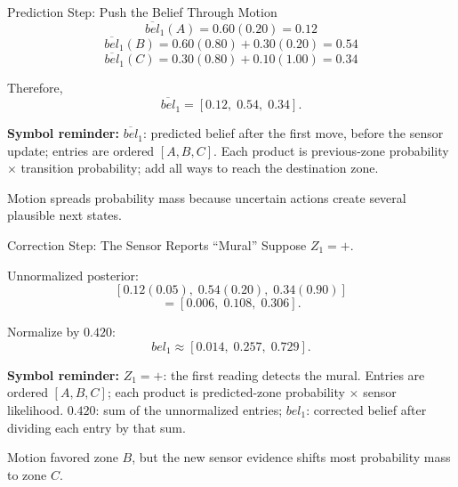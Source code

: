 \documentclass[aspectratio=169,10pt]{beamer}
\newcommand{\equationlegend}[1]{%
  \par\smallskip
  \begingroup
    \setlength{\fboxsep}{5pt}%
    \noindent\colorbox{DeckSoft}{%
      \parbox{\dimexpr\linewidth-2\fboxsep\relax}{%
        \footnotesize\textbf{Symbol reminder:} #1%
      }%
    }\par
  \endgroup
  \smallskip
}
\begin{document}
\begin{frame}[shrink=10]{Prediction Step: Push the Belief Through Motion}
  \[
    \overline{bel}_1(A)=0.60(0.20)=0.12
  \]
  \[
    \overline{bel}_1(B)=0.60(0.80)+0.30(0.20)=0.54
  \]
  \[
    \overline{bel}_1(C)=0.30(0.80)+0.10(1.00)=0.34
  \]

  Therefore,
  \[
    \overline{bel}_1=[0.12,\;0.54,\;0.34].
  \]

  \equationlegend{$\overline{bel}_1$: predicted belief after the first move, before the sensor update; entries are ordered $[A,B,C]$. Each product is previous-zone probability $\times$ transition probability; add all ways to reach the destination zone.}

  \begin{keyidea}
    Motion spreads probability mass because uncertain actions create several plausible next states.
  \end{keyidea}
\end{frame}

\begin{frame}[shrink=10]{Correction Step: The Sensor Reports ``Mural''}
  Suppose $Z_1=+$.

  Unnormalized posterior:
  \[
    [0.12(0.05),\;0.54(0.20),\;0.34(0.90)]
  \]
  \[
    =[0.006,\;0.108,\;0.306].
  \]

  Normalize by $0.420$:
  \[
    bel_1\approx[0.014,\;0.257,\;0.729].
  \]

  \equationlegend{$Z_1=+$: the first reading detects the mural. Entries are ordered $[A,B,C]$; each product is predicted-zone probability $\times$ sensor likelihood. $0.420$: sum of the unnormalized entries; $bel_1$: corrected belief after dividing each entry by that sum.}

  \begin{keyidea}
    Motion favored zone $B$, but the new sensor evidence shifts most probability mass to zone $C$.
  \end{keyidea}
\end{frame}
\end{document}
